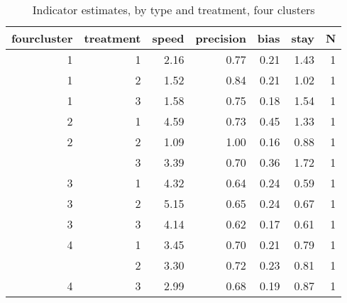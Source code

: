 \begin{table}

\caption{\label{tab:}Indicator estimates, by type and treatment, four clusters}
\centering
\begin{tabular}[t]{rrrrrrr}
\toprule
fourcluster & treatment & speed & precision & bias & stay & N\\
\midrule
1 & 1 & 2.16 & 0.77 & 0.21 & 1.43 & 1\\
1 & 2 & 1.52 & 0.84 & 0.21 & 1.02 & 1\\
1 & 3 & 1.58 & 0.75 & 0.18 & 1.54 & 1\\
2 & 1 & 4.59 & 0.73 & 0.45 & 1.33 & 1\\
2 & 2 & 1.09 & 1.00 & 0.16 & 0.88 & 1\\
\addlinespace
2 & 3 & 3.39 & 0.70 & 0.36 & 1.72 & 1\\
3 & 1 & 4.32 & 0.64 & 0.24 & 0.59 & 1\\
3 & 2 & 5.15 & 0.65 & 0.24 & 0.67 & 1\\
3 & 3 & 4.14 & 0.62 & 0.17 & 0.61 & 1\\
4 & 1 & 3.45 & 0.70 & 0.21 & 0.79 & 1\\
\addlinespace
4 & 2 & 3.30 & 0.72 & 0.23 & 0.81 & 1\\
4 & 3 & 2.99 & 0.68 & 0.19 & 0.87 & 1\\
\bottomrule
\end{tabular}
\end{table}
